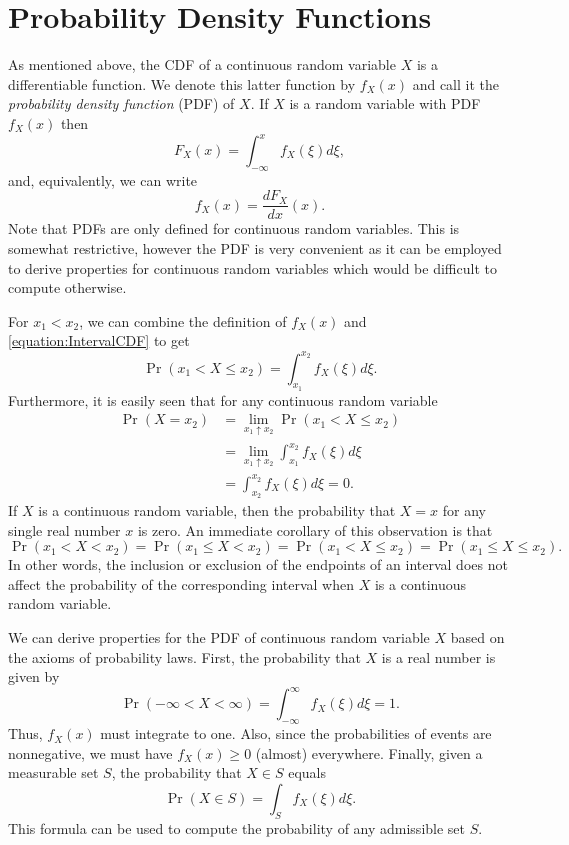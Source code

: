 \section{Probability Density Functions}

As mentioned above, the CDF of a continuous random variable $X$ is a differentiable function.
We denote this latter function by $f_X (x)$ and call it the \emph{probability density function} (PDF) of $X$.
If $X$ is a random variable with PDF $f_X (x)$ then
\begin{equation*}
F_X (x) = \int_{- \infty}^x f_X (\xi) d\xi ,
\end{equation*}
and, equivalently, we can write
\begin{equation*}
f_X (x) = \frac{d F_X}{dx} (x) .
\end{equation*}
Note that PDFs are only defined for continuous random variables.
This is somewhat restrictive, however the PDF is very convenient as it can be employed to derive properties for continuous random variables which would be difficult to compute otherwise.

For $x_1 < x_2$, we can combine the definition of $f_X(x)$ and \eqref{equation:IntervalCDF} to get
\begin{equation*}
\Pr (x_1 < X \leq x_2) = \int_{x_1}^{x_2} f_X (\xi) d\xi .
\end{equation*}
Furthermore, it is easily seen that for any continuous random variable
\begin{equation*}
\begin{split}
\Pr (X = x_2) &= \lim_{x_1 \uparrow x_2} \Pr (x_1 < X \leq x_2) \\
&= \lim_{x_1 \uparrow x_2} \int_{x_1}^{x_2} f_X (\xi) d\xi \\
&= \int_{x_2}^{x_2} f_X (\xi) d\xi = 0.
\end{split}
\end{equation*}
If $X$ is a continuous random variable, then the probability that $X = x$ for any single real number $x$ is zero.
An immediate corollary of this observation is that
\begin{equation*}
\Pr (x_1 < X < x_2)
= \Pr (x_1 \leq X < x_2)
= \Pr (x_1 < X \leq x_2)
= \Pr (x_1 \leq X \leq x_2) .
\end{equation*}
In other words, the inclusion or exclusion of the endpoints of an interval does not affect the probability of the corresponding interval when $X$ is a continuous random variable.

We can derive properties for the PDF of continuous random variable $X$ based on the axioms of probability laws.
First, the probability that $X$ is a real number is given by
\begin{equation*}
\Pr (-\infty < X < \infty) = \int_{-\infty}^{\infty} f_X (\xi) d\xi = 1.
\end{equation*}
Thus, $f_X (x)$ must integrate to one.
Also, since the probabilities of events are nonnegative, we must have $f_X (x) \geq 0$ (almost) everywhere.
Finally, given a measurable set $S$, the probability that $X \in S$ equals
\begin{equation*}
\Pr (X \in S) = \int_S f_X (\xi) d\xi .
\end{equation*}
This formula can be used to compute the probability of any admissible set $S$.


